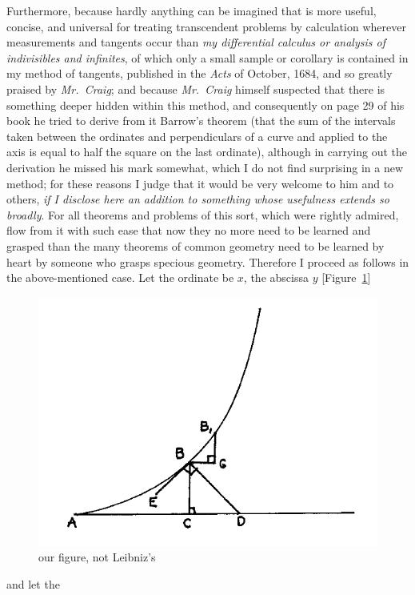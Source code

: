 \documentclass[twoside,openright]{article}
\begin{document}
Furthermore, because hardly anything\label{hardany} can be imagined
that is more useful, concise, and universal for treating transcendent
problems by calculation wherever measurements and tangents occur than
{\em my differential calculus or analysis of indivisibles and
  infinites}, of which only a small sample or corollary is contained
in my method of tangents, published in the {\em Acts} of October,
1684, and so greatly praised by {\em Mr.\ Craig}; and because {\em
  Mr.\ Craig} himself suspected that there is something deeper hidden
within this method, and consequently on page 29 of his book he tried
to derive from it Barrow's theorem (that the sum of the intervals
taken between the ordinates and perpendiculars of a curve and applied
to the axis is equal to half the square on the last
ordinate), although in
carrying out the derivation he missed his mark somewhat, which I do
not find surprising in a new method; for these reasons I judge that it
would be very welcome to him and to others, {\em if I disclose here an
  addition to something whose usefulness extends so broadly}.  For all
theorems and problems of this sort, which were rightly admired, flow
from it with such ease that now they no more need to be learned and
grasped than the many theorems of common geometry need to be learned
by heart by someone who grasps specious geometry. Therefore I proceed as follows in the
above-mentioned case.  Let the ordinate be $x$, the abscissa $y$
[Figure~\ref{barrow1}]
\begin{figure}[htp]
\begin{center}
\includegraphics[width=.75\textwidth]{fig/Figure40}
\caption{our figure, not Leibniz's}
\label{barrow1}
\end{center}
\end{figure}  and let the
\end{document}
